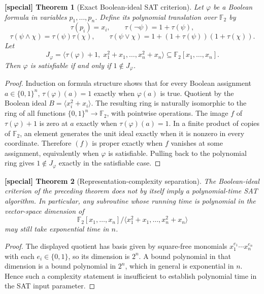 \documentclass[11pt]{article}
\theoremstyle{special}
\newtheorem{specialthm}{[special] Theorem}[section]
\theoremstyle{definition}
\newcommand{\Ftwo}{\mathbb F_2}
\begin{document}
\begin{specialthm}[Exact Boolean-ideal SAT criterion]
Let $\varphi$ be a Boolean formula in variables $p_1,\dots,p_n$. Define its polynomial translation over $\Ftwo$ by
\[
\tau(p_i)=x_i,\qquad \tau(\neg\psi)=1+\tau(\psi),
\]
\[
\tau(\psi\wedge\chi)=\tau(\psi)\tau(\chi),\qquad
\tau(\psi\vee\chi)=1+(1+\tau(\psi))(1+\tau(\chi)).
\]
Let
\[
J_\varphi=\langle \tau(\varphi)+1,\;x_1^2+x_1,\dots,x_n^2+x_n\rangle\subseteq\Ftwo[x_1,\dots,x_n].
\]
Then $\varphi$ is satisfiable if and only if $1\notin J_\varphi$.
\end{specialthm}
\begin{proof}
Induction on formula structure shows that for every Boolean assignment $a\in\{0,1\}^n$, $\tau(\varphi)(a)=1$ exactly when $\varphi(a)$ is true. Quotient by the Boolean ideal
$B=\langle x_i^2+x_i\rangle$.
The resulting ring is naturally isomorphic to the ring of all functions $\{0,1\}^n\to\Ftwo$, with pointwise operations. The image $f$ of $\tau(\varphi)+1$ is zero at $a$ exactly when $\tau(\varphi)(a)=1$. In a finite product of copies of $\Ftwo$, an element generates the unit ideal exactly when it is nonzero in every coordinate. Therefore $(f)$ is proper exactly when $f$ vanishes at some assignment, equivalently when $\varphi$ is satisfiable. Pulling back to the polynomial ring gives $1\notin J_\varphi$ exactly in the satisfiable case.\qedhere
\end{proof}

\begin{specialthm}[Representation-complexity separation]
The Boolean-ideal criterion of the preceding theorem does not by itself imply a polynomial-time SAT algorithm. In particular, any subroutine whose running time is polynomial in the vector-space dimension of
\[
\Ftwo[x_1,\dots,x_n]/\langle x_1^2+x_1,\dots,x_n^2+x_n\rangle
\]
may still take exponential time in $n$.
\end{specialthm}
\begin{proof}
The displayed quotient has basis given by square-free monomials $x_1^{e_1}\cdots x_n^{e_n}$ with each $e_i\in\{0,1\}$, so its dimension is $2^n$. A bound polynomial in that dimension is a bound polynomial in $2^n$, which in general is exponential in $n$. Hence such a complexity statement is insufficient to establish polynomial time in the SAT input parameter.\qedhere
\end{proof}
\end{document}

